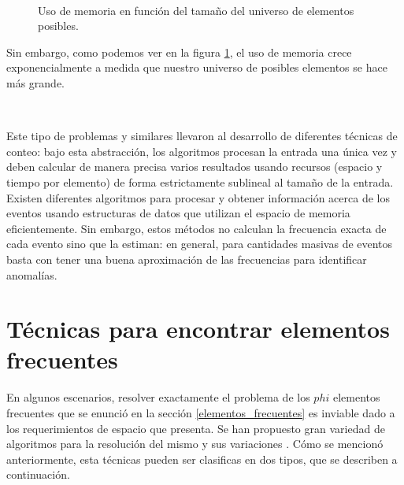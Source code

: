 \documentclass[a4paper,12pt, oneside]{article}
\begin{document}
\

\begin{figure}[ht]
	\centering

	\caption{Uso de memoria en función del tamaño del universo de elementos posibles.}
	\label{fig:universe_exponencial}
\end{figure}


Sin embargo, como podemos ver en la figura \ref{fig:universe_exponencial}, el uso de memoria crece exponencialmente a medida que nuestro universo de posibles elementos se hace más grande.

\

Este tipo de problemas y similares llevaron al desarrollo de diferentes técnicas de conteo: bajo esta abstracción, los algoritmos procesan la entrada una única vez y deben calcular de manera precisa varios resultados usando recursos (espacio y tiempo por elemento) de forma estrictamente sublineal al tamaño de la entrada\cite{Muthukrishnan:2005:DSA:1166409.1166410}. Existen diferentes algoritmos para procesar y obtener información acerca de los eventos usando estructuras de datos que utilizan el espacio de memoria eficientemente. Sin embargo, estos métodos no calculan la frecuencia exacta de cada evento sino que la estiman: en general, para cantidades masivas de eventos basta con tener una buena aproximación de las frecuencias para identificar anomalías.

\newpage

\section{Técnicas para encontrar elementos frecuentes}\label{sec:tecnicas_elementos_frecuentes}
En algunos escenarios, resolver exactamente el problema de los $phi$ elementos frecuentes que se enunció en la sección \ref{elementos_frecuentes} es inviable dado a los requerimientos de espacio que presenta\cite{Charikar:2002:FFI:646255.684566}. Se han propuesto gran variedad de algoritmos para la resolución del mismo y sus variaciones \cite{Charikar:2002:FFI:646255.684566}\cite{Cormode:2005:WHW:1061318.1061325}\cite{Demaine:2002:FEI:647912.740658}\cite{Manku:2002:AFC:1287369.1287400}. Cómo se mencionó anteriormente, esta técnicas pueden ser clasificas en dos tipos, que se describen a continuación.
\end{document}
